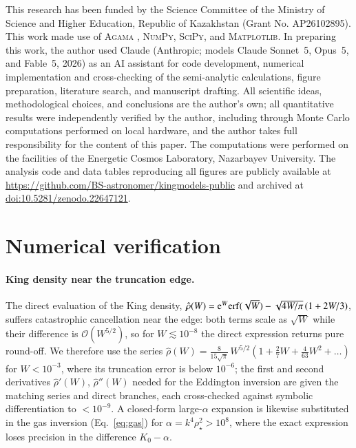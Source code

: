 \documentclass{aa}
\begin{document}
\begin{acknowledgements}
This research has been funded by the Science Committee of the Ministry of Science and Higher Education, Republic of Kazakhstan (Grant No. AP26102895).
This work made use of \textsc{Agama} \citep{Vasiliev2019},
\textsc{NumPy}, \textsc{SciPy}, and \textsc{Matplotlib}.
In preparing this work, the author used Claude (Anthropic; models Claude
Sonnet~5, Opus~5, and Fable~5, 2026) as an AI
assistant for code development, numerical implementation and
cross-checking of the semi-analytic calculations, figure preparation,
literature search, and manuscript drafting. All scientific ideas,
methodological choices, and conclusions are the author's own; all
quantitative results were independently verified by the author,
including through Monte Carlo computations performed on local hardware,
and the author takes full responsibility for the content of this paper.
The computations were performed on the facilities of the Energetic Cosmos
Laboratory, Nazarbayev University.
The analysis code and data tables reproducing all figures are publicly
available at \url{https://github.com/BS-astronomer/kingmodels-public} and
archived at \href{https://doi.org/10.5281/zenodo.22647121}
{doi:10.5281/zenodo.22647121}.
\end{acknowledgements}




\appendix

\section{Numerical verification}
\label{app:num}

\paragraph{King density near the truncation edge.}
The direct evaluation of the King density,
$\hat\rho(W)={\rm e}^W{\rm erf}(\sqrt W)-\sqrt{4W/\pi}\,(1+2W/3)$,
suffers catastrophic cancellation near the edge: both terms scale as
$\sqrt W$ while their difference is $\mathcal{O}(W^{5/2})$, so for
$W\lesssim10^{-8}$ the direct expression returns pure round-off. We
therefore use the series
$\hat\rho(W)=\tfrac{8}{15\sqrt{\pi}}\,W^{5/2}
(1+\tfrac{2}{7}W+\tfrac{4}{63}W^{2}+\dots)$ for $W<10^{-3}$, where its
truncation error is below $10^{-6}$; the first and second derivatives
$\hat\rho'(W)$, $\hat\rho''(W)$ needed for the Eddington inversion are
given the matching series and direct branches, each cross-checked
against symbolic differentiation to $<10^{-9}$. A closed-form
large-$\alpha$ expansion is likewise substituted in the gas inversion
(Eq.~\ref{eq:gas}) for $\alpha=k^4\rho_\star^2>10^8$, where the exact
expression loses precision in the difference $K_0-\alpha$.
\end{document}
